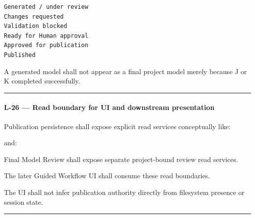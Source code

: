\begin{verbatim}
Generated / under review
Changes requested
Validation blocked
Ready for Human approval
Approved for publication
Published
\end{verbatim}

A generated model shall not appear as a final project model merely because J or K completed successfully.

\begin{center}\rule{0.5\linewidth}{0.5pt}\end{center}

\hypertarget{l-26--read-boundary-for-ui-and-downstream-presentation}{%
\paragraph{L-26 --- Read boundary for UI and downstream presentation}\label{l-26--read-boundary-for-ui-and-downstream-presentation}}

Publication persistence shall expose explicit read services conceptually like:

\begin{Shaded}
\begin{Highlighting}[]
\NormalTok{) }\OperatorTok{{-}\textgreater{}} \NormalTok{[PublishedOutputManifest, ...]}
\end{Highlighting}
\end{Shaded}

and:

\begin{Shaded}
\begin{Highlighting}[]
\NormalTok{) }\OperatorTok{{-}\textgreater{}}
\end{Highlighting}
\end{Shaded}

Final Model Review shall expose separate project-bound review read services.

The later Guided Workflow UI shall consume these read boundaries.

The UI shall not infer publication authority directly from filesystem presence or session state.

\begin{center}\rule{0.5\linewidth}{0.5pt}\end{center}

